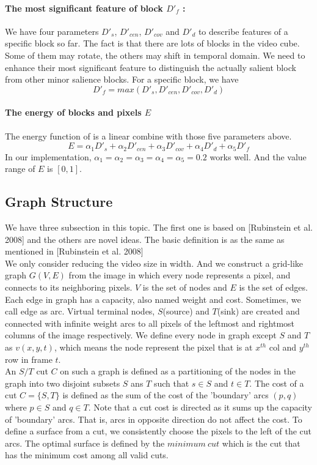 \documentclass[a4paper, twocolumn]{article}
\begin{document}
			\paragraph{The most significant feature of block ${D'}_f$ :}
			We have four parameters ${D'}_s$, ${D'}_{cen}$, ${D'}_{cov}$ and ${D'}_d$ to describe features of a specific block so far. The fact is that there are lots of blocks in the video cube. Some of them may rotate, the others may shift in temporal domain. We need to enhance their most significant feature to distinguish the actually salient block from other minor salience blocks. For a specific block, we have
			$${D'}_f = max({D'}_s, {D'}_{cen}, {D'}_{cov}, {D'}_d)$$

			\paragraph{The energy of blocks and pixels $E$}
			The energy function of is a linear combine with those five parameters above.
			$$E = \alpha_1 {D'}_s + \alpha_2 {D'}_{cen} +　\alpha_3 {D'}_{cov} + \alpha_4 {D'}_d + \alpha_5 {D'}_f$$
			In our implementation, $\alpha_1 = \alpha_2 = \alpha_3 = \alpha_4 = \alpha_5 = 0.2$ works well. And the value range of $E$ is $[0,1]$.\\
			
		\subsection{Graph Structure}
			We have three subsection in this topic. The first one is based on [Rubinstein et al. 2008] and the others are novel ideas. The basic definition is as the same as mentioned in [Rubinstein et al. 2008]\\
			\linebreak
			We only consider reducing the video size in width. And we construct a grid-like graph $G(V,E)$ from the image in which every node represents a pixel, and connects to its neighboring pixels. $V$ is the set of nodes and $E$ is the set of edges. Each edge in graph has a capacity, also named weight and cost. Sometimes, we call edge as arc. Virtual terminal nodes, $S$(source) and $T$(sink) are created and connected with infinite weight arcs to all pixels of the leftmost and rightmost columns of the image respectively. We define every node in graph except $S$ and $T$ as $v(x,y,t)$, which means the node represent the pixel that is at $x^{th}$ col and $y^{th}$ row in frame $t$.\\
			\linebreak
			An $S/T$ cut $C$ on such a graph is defined as a partitioning of the nodes in the graph into two disjoint subsets $S$ ans $T$ such that $s \in S$ and $t \in T$. The cost of a cut $C = \{S,T\}$ is defined as the sum of the cost of the 'boundary' arcs $(p,q)$ where $p \in S$ and $q \in T$. Note that a cut cost is directed as it sums up the capacity of 'boundary' arcs. That is, arcs in opposite direction do not affect the cost. To define a surface from a cut, we consistently choose the pixels to the left of the cut arcs. The optimal surface is defined by the $minimum \ cut$ which is the cut that has the minimum cost among all valid cuts.\\
			
\end{document}
